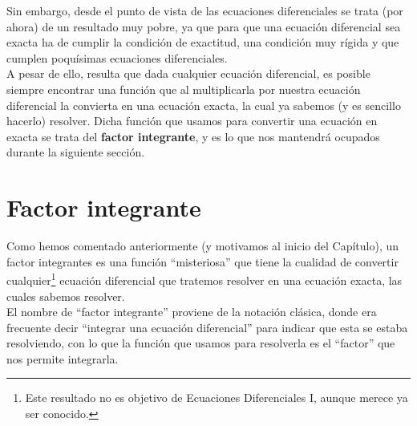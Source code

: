 Sin embargo, desde el punto de vista de las ecuaciones diferenciales se trata (por ahora) de un resultado muy pobre, ya que para que una ecuación diferencial sea exacta ha de cumplir la condición de exactitud, una condición muy rígida y que cumplen poquísimas ecuaciones diferenciales.\\

A pesar de ello, resulta que dada cualquier ecuación diferencial, es posible siempre encontrar una función que al multiplicarla por nuestra ecuación diferencial la convierta en una ecuación exacta, la cual ya sabemos (y es sencillo hacerlo) resolver. Dicha función que usamos para convertir una ecuación en exacta se trata del \textbf{factor integrante}, y es lo que nos mantendrá ocupados durante la siguiente sección.

\section{Factor integrante}
Como hemos comentado anteriormente (y motivamos al inicio del Capítulo), un factor integrantes es una función ``misteriosa'' que tiene la cualidad de convertir cualquier\footnote{Este resultado no es objetivo de Ecuaciones Diferenciales I, aunque merece ya ser conocido.} ecuación diferencial que tratemos resolver en una ecuación exacta, las cuales sabemos resolver.\\

El nombre de ``factor integrante'' proviene de la notación clásica, donde era frecuente decir ``integrar una ecuación diferencial'' para indicar que esta se estaba resolviendo, con lo que la función que usamos para resolverla es el ``factor'' que nos permite integrarla.\\

